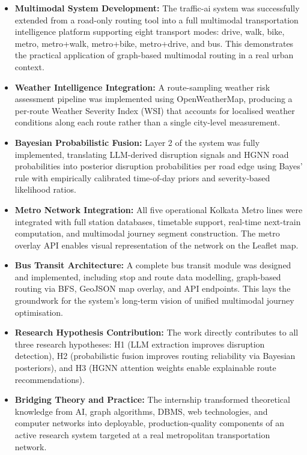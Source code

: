 \documentclass[12pt, a4paper]{report}
\begin{document}
\begin{itemize}

    \item \textbf{Multimodal System Development:} The traffic-ai system was successfully extended from a road-only routing tool into a full multimodal transportation intelligence platform supporting eight transport modes: drive, walk, bike, metro, metro+walk, metro+bike, metro+drive, and bus. This demonstrates the practical application of graph-based multimodal routing in a real urban context.

    \item \textbf{Weather Intelligence Integration:} A route-sampling weather risk assessment pipeline was implemented using OpenWeatherMap, producing a per-route Weather Severity Index (WSI) that accounts for localised weather conditions along each route rather than a single city-level measurement.

    \item \textbf{Bayesian Probabilistic Fusion:} Layer 2 of the system was fully implemented, translating LLM-derived disruption signals and HGNN road probabilities into posterior disruption probabilities per road edge using Bayes' rule with empirically calibrated time-of-day priors and severity-based likelihood ratios.

    \item \textbf{Metro Network Integration:} All five operational Kolkata Metro lines were integrated with full station databases, timetable support, real-time next-train computation, and multimodal journey segment construction. The metro overlay API enables visual representation of the network on the Leaflet map.

    \item \textbf{Bus Transit Architecture:} A complete bus transit module was designed and implemented, including stop and route data modelling, graph-based routing via BFS, GeoJSON map overlay, and API endpoints. This lays the groundwork for the system's long-term vision of unified multimodal journey optimisation.

    \item \textbf{Research Hypothesis Contribution:} The work directly contributes to all three research hypotheses: H1 (LLM extraction improves disruption detection), H2 (probabilistic fusion improves routing reliability via Bayesian posteriors), and H3 (HGNN attention weights enable explainable route recommendations).

    \item \textbf{Bridging Theory and Practice:} The internship transformed theoretical knowledge from AI, graph algorithms, DBMS, web technologies, and computer networks into deployable, production-quality components of an active research system targeted at a real metropolitan transportation network.

\end{itemize}
\end{document}
